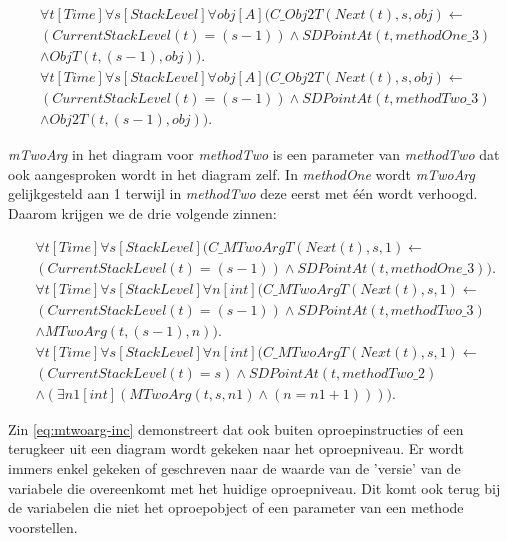 \begin{align}
	\nonumber &\forall{t}[Time]\forall{s}[StackLevel]\forall{obj}[A](C\_Obj2T(Next(t), s, obj) \leftarrow
	\\ \nonumber &(CurrentStackLevel(t) = (s-1)) \land SDPointAt(t, methodOne\_3) \\ &\land ObjT(t, (s-1), obj)). \\
	\nonumber &\forall{t}[Time]\forall{s}[StackLevel]\forall{obj}[A](C\_Obj2T(Next(t), s, obj) \leftarrow
	\\ \nonumber &(CurrentStackLevel(t) = (s-1)) \land SDPointAt(t, methodTwo\_3) \\ &\land Obj2T(t, (s-1), obj)).
\end{align}

\textit{mTwoArg} in het diagram voor \textit{methodTwo} is een parameter van \textit{methodTwo} dat ook aangesproken wordt in het diagram zelf. In \textit{methodOne} wordt \textit{mTwoArg} gelijkgesteld aan 1 terwijl in \textit{methodTwo} deze eerst met \'e\'en wordt verhoogd. Daarom krijgen we de drie volgende zinnen:

\begin{align}
	\nonumber &\forall{t}[Time]\forall{s}[StackLevel](C\_MTwoArgT(Next(t), s, 1) \leftarrow \\ &(CurrentStackLevel(t) = (s-1)) \land SDPointAt(t, methodOne\_3)). \\
	\nonumber &\forall{t}[Time]\forall{s}[StackLevel]\forall{n}[int](C\_MTwoArgT(Next(t), s, 1) \leftarrow \\ \nonumber &(CurrentStackLevel(t) = (s-1)) \land SDPointAt(t, methodTwo\_3) \\ &\land MTwoArg(t, (s-1), n)). \\
	\nonumber &\forall{t}[Time]\forall{s}[StackLevel]\forall{n}[int](C\_MTwoArgT(Next(t), s, 1) \leftarrow \\ \nonumber &(CurrentStackLevel(t) = s) \land SDPointAt(t, methodTwo\_2) \\ &\land (\exists{n1}[int](MTwoArg(t, s, n1) \land (n = n1 + 1)))).\label{eq:mtwoarg-inc}
\end{align}

Zin \ref{eq:mtwoarg-inc} demonstreert dat ook buiten oproepinstructies of een terugkeer uit een diagram wordt gekeken naar het oproepniveau. Er wordt immers enkel gekeken of geschreven naar de waarde van de 'versie' van de variabele die overeenkomt met het huidige oproepniveau. Dit komt ook terug bij de variabelen die niet het oproepobject of een parameter van een methode voorstellen.

